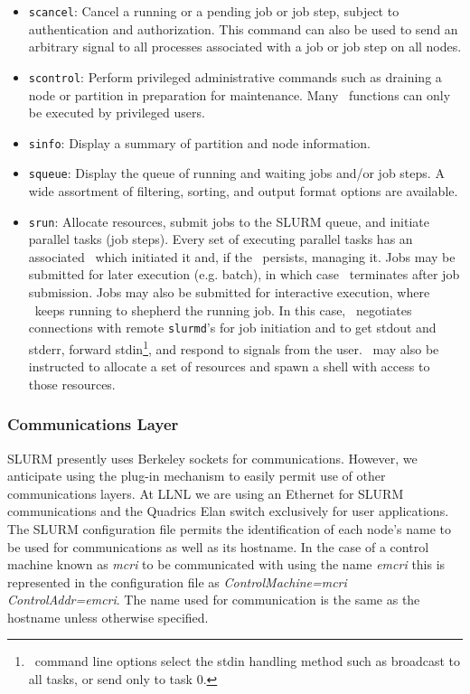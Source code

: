 \begin{itemize}
\item {\tt scancel}: Cancel a running or a pending job or job step, 
subject to authentication and authorization. This command can also 
be used to send an arbitrary signal to all processes associated with 
a job or job step on all nodes.

\item {\tt scontrol}: Perform privileged administrative commands
such as draining a node or partition in preparation for maintenance. 
Many \scontrol\ functions can only be executed by privileged users.

\item {\tt sinfo}: Display a summary of partition and node information.

\item {\tt squeue}: Display the queue of running and waiting jobs 
and/or job steps. A wide assortment of filtering, sorting, and output 
format options are available.

\item {\tt srun}: Allocate resources, submit jobs to the SLURM queue,
and initiate parallel tasks (job steps). 
Every set of executing parallel tasks has an associated \srun\ which 
initiated it and, if the \srun\ persists, managing it. 
Jobs may be submitted for later execution (e.g. batch), in which case 
\srun\ terminates after job submission. 
Jobs may also be submitted for interactive execution, where \srun\ keeps 
running to shepherd the running job. In this case, 
\srun\ negotiates connections with remote {\tt slurmd}'s 
for job initiation and to
get stdout and stderr, forward stdin\footnote{\srun\ command
line options select the stdin handling method such as broadcast to all
tasks, or send only to task 0.}, and respond to signals from the user.
\srun\ may also be instructed to allocate a set of resources and
spawn a shell with access to those resources.

\end{itemize}

\subsubsection{Communications Layer}

SLURM presently uses Berkeley sockets for communications. 
However, we anticipate using the plug-in mechanism to easily 
permit use of other communications layers. 
At LLNL we are using an Ethernet for SLURM communications and 
the Quadrics Elan switch exclusively for user applications. 
The SLURM configuration file permits the identification of each 
node's name to be used for communications as well as its hostname. 
In the case of a control machine known as {\em mcri} to be communicated 
with using the name {\em emcri} this is represented in the 
configuration file as {\em ControlMachine=mcri ControlAddr=emcri}.
The name used for communication is the same as the hostname unless 
otherwise specified.

